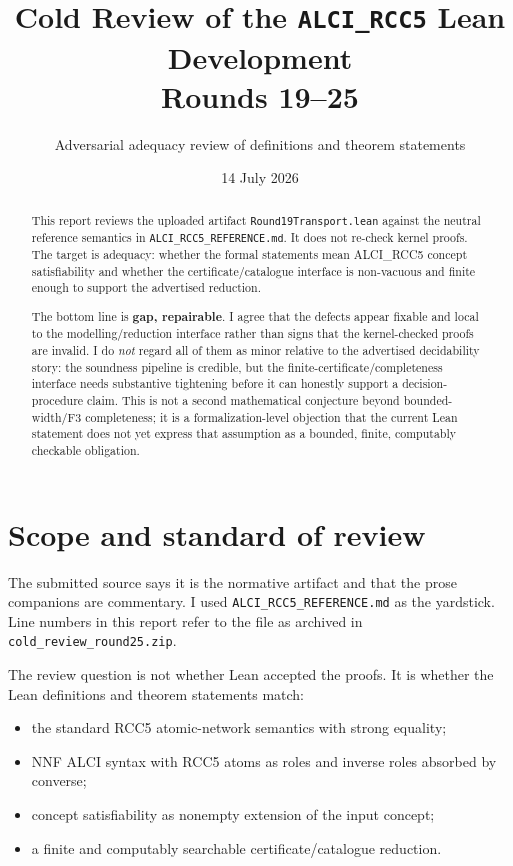 \documentclass[11pt]{article}
\title{Cold Review of the \texttt{ALCI\_RCC5} Lean Development\\Rounds 19--25}
\author{Adversarial adequacy review of definitions and theorem statements}
\date{14 July 2026}
\begin{document}
\maketitle

\begin{abstract}
This report reviews the uploaded artifact \texttt{Round19Transport.lean}
against the neutral reference semantics in \texttt{ALCI\_RCC5\_REFERENCE.md}.
It does not re-check kernel proofs.  The target is adequacy: whether the
formal statements mean ALCI\_RCC5 concept satisfiability and whether the
certificate/catalo\-gue interface is non-vacuous and finite enough to support
the advertised reduction.

The bottom line is \textbf{gap, repairable}.  I agree that the defects appear
fixable and local to the modelling/reduction interface rather than signs that
the kernel-checked proofs are invalid.  I do \emph{not} regard all of them as
minor relative to the advertised decidability story: the soundness pipeline is
credible, but the finite-certificate/completeness interface needs substantive
tightening before it can honestly support a decision-procedure claim.  This is
not a second mathematical conjecture beyond bounded-width/F3 completeness; it
is a formalization-level objection that the current Lean statement does not yet
express that assumption as a bounded, finite, computably checkable obligation.
\end{abstract}

\section{Scope and standard of review}

The submitted source says it is the normative artifact and that the prose
companions are commentary.  I used \texttt{ALCI\_RCC5\_REFERENCE.md} as the
yardstick.  Line numbers in this report refer to the file as archived in
\texttt{cold\_review\_round25.zip}.

The review question is not whether Lean accepted the proofs.  It is whether
the Lean definitions and theorem statements match:
\begin{itemize}
  \item the standard RCC5 atomic-network semantics with strong equality;
  \item NNF ALCI syntax with RCC5 atoms as roles and inverse roles absorbed by
        converse;
  \item concept satisfiability as nonempty extension of the input concept;
  \item a finite and computably searchable certificate/catalogue reduction.
\end{itemize}
\end{document}
